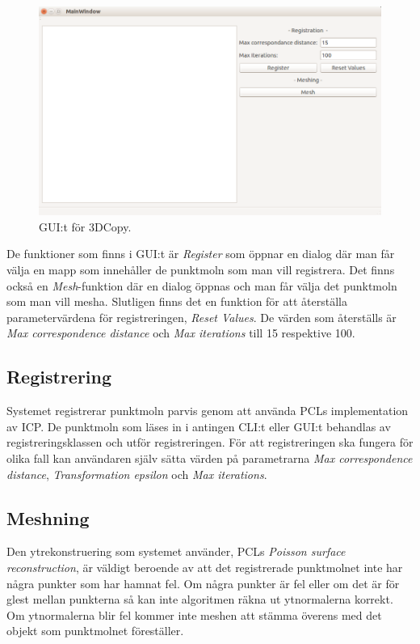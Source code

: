 \begin{figure}[H]
	\centering
	\includegraphics[width=130mm]{figures/3DCopyGUI.PNG}
	\caption{GUI:t för 3DCopy.}
	\label{fig:3dcopy_gui_res}
\end{figure}

De funktioner som finns i GUI:t är \textit{Register} som öppnar en dialog där man får välja en mapp som innehåller de punktmoln som man vill registrera. Det finns också en \textit{Mesh}-funktion där en dialog öppnas och man får välja det punktmoln som man vill mesha. Slutligen finns det en funktion för att återställa parametervärdena för registreringen, \textit{Reset Values}. De värden som återställs är \textit{Max correspondence distance} och \textit{Max iterations} till 15 respektive 100.

\subsection{Registrering}
Systemet registrerar punktmoln parvis genom att använda PCLs implementation av ICP. De punktmoln som läses in i antingen CLI:t eller GUI:t behandlas av registreringsklassen och utför registreringen. För att registreringen ska fungera för olika fall kan användaren själv sätta värden på parametrarna \textit{Max correspondence distance}, \textit{Transformation epsilon} och \textit{Max iterations}.

\subsection{Meshning}
Den ytrekonstruering som systemet använder, PCLs \textit{Poisson surface reconstruction}, är väldigt beroende av att det registrerade punktmolnet inte har några punkter som har hamnat fel. Om några punkter är fel eller om det är för glest mellan punkterna så kan inte algoritmen räkna ut ytnormalerna korrekt. Om ytnormalerna blir fel kommer inte meshen att stämma överens med det objekt som punktmolnet föreställer.

